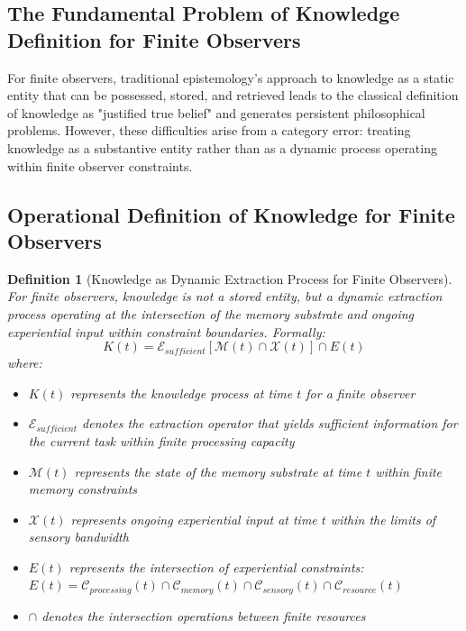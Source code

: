 \documentclass{article}
\newtheorem{definition}[theorem]{Definition}
\begin{document}
\subsection{The Fundamental Problem of Knowledge Definition for Finite Observers}

For finite observers, traditional epistemology's approach to knowledge as a static entity that can be possessed, stored, and retrieved leads to the classical definition of knowledge as "justified true belief" and generates persistent philosophical problems. However, these difficulties arise from a category error: treating knowledge as a substantive entity rather than as a dynamic process operating within finite observer constraints.

\subsection{Operational Definition of Knowledge for Finite Observers}

\begin{definition}[Knowledge as Dynamic Extraction Process for Finite Observers]
For finite observers, knowledge is not a stored entity, but a dynamic extraction process operating at the intersection of the memory substrate and ongoing experiential input within constraint boundaries. Formally:
\begin{equation}
K(t) = \mathcal{E}_{sufficient}[\mathcal{M}(t) \cap \mathcal{X}(t)] \cap E(t)
\end{equation}
where:
\begin{itemize}
\item $K(t)$ represents the knowledge process at time $t$ for a finite observer
\item $\mathcal{E}_{sufficient}$ denotes the extraction operator that yields sufficient information for the current task within finite processing capacity
\item $\mathcal{M}(t)$ represents the state of the memory substrate at time $t$ within finite memory constraints
\item $\mathcal{X}(t)$ represents ongoing experiential input at time $t$ within the limits of sensory bandwidth
\item $E(t)$ represents the intersection of experiential constraints: $E(t) = \mathcal{C}_{processing}(t) \cap \mathcal{C}_{memory}(t) \cap \mathcal{C}_{sensory}(t) \cap \mathcal{C}_{resource}(t)$
\item $\cap$ denotes the intersection operations between finite resources
\end{itemize}
\end{definition}
\end{document}
